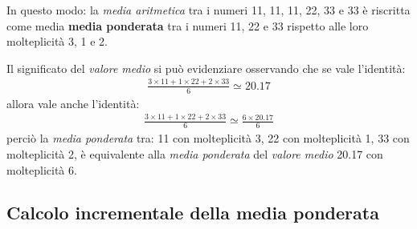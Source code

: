 \documentclass[12pt,a4paper]{article}
\begin{document}
In questo  modo: la  \emph{media aritmetica}  tra i numeri  \num{11}, \num{11},  \num{11}, \num{22},
\num{33} e \num{33} è riscritta come media  \textbf{media ponderata} tra i numeri \num{11}, \num{22}
e \num{33} rispetto alle loro molteplicità \num{3}, \num{1} e \num{2}.

Il significato del \emph{valore medio} si può evidenziare osservando che se vale l'identità:
\begin{align*}
  \frac{\num{3} \times{} \num{11} + \num{1} \times{} \num{22}
  + \num{2} \times{} \num{33}}{\num{6}}
  \simeq \num{20,17}
\end{align*}
allora vale anche l'identità:
\begin{align*}
  \frac{\num{3} \times{} \num{11} + \num{1} \times{} \num{22}
  + \num{2} \times{} \num{33}}{\num{6}}
  \simeq \frac{\num{6} \times{} \num{20,17}}{\num{6}}
\end{align*}
perciò la \emph{media  ponderata} tra: \num{11} con molteplicità \num{3},  \num{22} con molteplicità
\num{1},  \num{33}  con  molteplicità  \num{2},   è  equivalente  alla  \emph{media  ponderata}  del
\emph{valore medio} \num{20,17} con molteplicità \num{6}.


\subsection{Calcolo incrementale della media ponderata}
\end{document}
